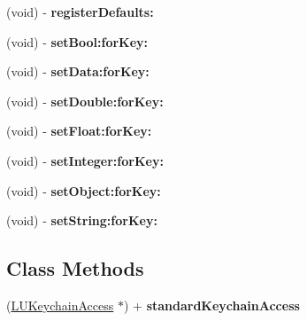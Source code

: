 \begin{DoxyCompactItemize}
(void) -\/ {\bfseries register\+Defaults\+:}
\item 
\mbox{\label{interface_l_u_keychain_access_a4c1ba958e1dd4a1559d845b31ed36df4}} 
(void) -\/ {\bfseries set\+Bool\+:for\+Key\+:}
\item 
\mbox{\label{interface_l_u_keychain_access_ae32caf83e921c65b3567b533bdf5d0a4}} 
(void) -\/ {\bfseries set\+Data\+:for\+Key\+:}
\item 
\mbox{\label{interface_l_u_keychain_access_afcce38895ac6bb83376d8593c43be091}} 
(void) -\/ {\bfseries set\+Double\+:for\+Key\+:}
\item 
\mbox{\label{interface_l_u_keychain_access_a322aaed1cda576f5bcf1b843a1235832}} 
(void) -\/ {\bfseries set\+Float\+:for\+Key\+:}
\item 
\mbox{\label{interface_l_u_keychain_access_a5520fe6ace25f9837d36ae35e62371c5}} 
(void) -\/ {\bfseries set\+Integer\+:for\+Key\+:}
\item 
\mbox{\label{interface_l_u_keychain_access_ab49b6ef651d8b56dc619a6afed4e690a}} 
(void) -\/ {\bfseries set\+Object\+:for\+Key\+:}
\item 
\mbox{\label{interface_l_u_keychain_access_a006449f86f8aa4de492d7c61ac027a54}} 
(void) -\/ {\bfseries set\+String\+:for\+Key\+:}
\end{DoxyCompactItemize}
\subsection*{Class Methods}
\begin{DoxyCompactItemize}
\item 
\mbox{\label{interface_l_u_keychain_access_a31f4824d67c9f76192008a8fc7ae7b73}} 
(\mbox{\hyperlink{interface_l_u_keychain_access}{L\+U\+Keychain\+Access}} $\ast$) + {\bfseries standard\+Keychain\+Access}
\end{DoxyCompactItemize}
